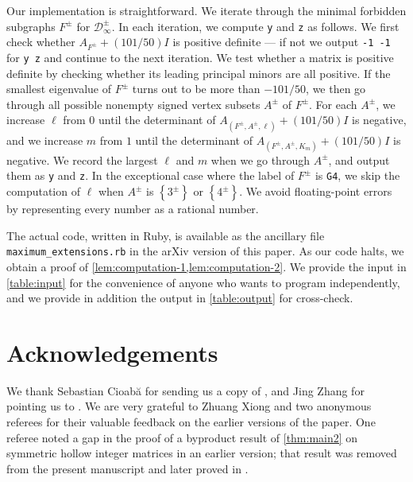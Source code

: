 \documentclass[11pt]{article}
\theoremstyle{definition}
\theoremstyle{remark}
\newcommand{\sset}[1]{\left\{{#1}\right\}}
\newcommand{\D}{\mathcal{D}}
\begin{document}
Our implementation is straightforward. We iterate through the minimal forbidden subgraphs $F^\pm$ for $\D_\infty^\pm$. In each iteration, we compute \texttt{y} and \texttt{z} as follows. We first check whether $A_{F^\pm} + (101/50)I$ is positive definite --- if not we output \texttt{-1 -1} for \texttt{y z} and continue to the next iteration. We test whether a matrix is positive definite by checking whether its leading principal minors are all positive. If the smallest eigenvalue of $F^\pm$ turns out to be more than $-101/50$, we then go through all possible nonempty signed vertex subsets $A^\pm$ of $F^\pm$. For each $A^\pm$, we increase $\ell$ from $0$ until the determinant of $A_{(F^\pm, A^\pm, \ell)} + (101/50)I$ is negative, and we increase $m$ from $1$ until the determinant of $A_{(F^\pm, A^\pm, K_m)} + (101/50)I$ is negative. We record the largest $\ell$ and $m$ when we go through $A^\pm$, and output them as \texttt{y} and \texttt{z}. In the exceptional case where the label of $F^\pm$ is \texttt{G4}, we skip the computation of $\ell$ when $A^\pm$ is $\sset{3^\pm}$ or $\sset{4^\pm}$. We avoid floating-point errors by representing every number as a rational number.

The actual code, written in Ruby, is available as the ancillary file \texttt{maximum\_extensions.rb} in the arXiv version of this paper. As our code halts, we obtain a proof of \cref{lem:computation-1,lem:computation-2}. We provide the input in \cref{table:input} for the convenience of anyone who wants to program independently, and we provide in addition the output in \cref{table:output} for cross-check.

\section*{Acknowledgements}

We thank Sebastian Cioab\u{a} for sending us a copy of \cite{H77a}, and Jing Zhang for pointing us to \cite{D13}. We are very grateful to Zhuang Xiong and two anonymous referees for their valuable feedback on the earlier versions of the paper. One referee noted a gap in the proof of a byproduct result of \cref{thm:main2} on symmetric hollow integer matrices in an earlier version; that result was removed from the present manuscript and later proved in \cite{J25}.



\end{document}
